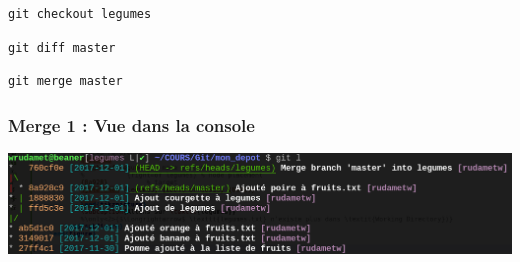 \documentclass[table,tikz,12pt,svgnames]{beamer}
\begin{document}
\begin{frame}[fragile]
\vspace{0.4cm} \begin{center} \noindent{} \end{center} \vspace{-0.4cm}
\begin{verbatim}
git checkout legumes
\end{verbatim}
\pause[2]
\begin{verbatim}
git diff master
\end{verbatim}
\pause[3]
\begin{verbatim}
git merge master
\end{verbatim}
\end{frame}

\begin{frame}
\frametitle{Merge 1 : Vue dans la console}
\begin{adjustwidth}{-1cm}{-0.8cm}{}
	\begin{center}
		{\includegraphics[scale=0.3]{images/git_log_merge.png}}
	\end{center}
\end{adjustwidth}
\end{frame}
\end{document}
